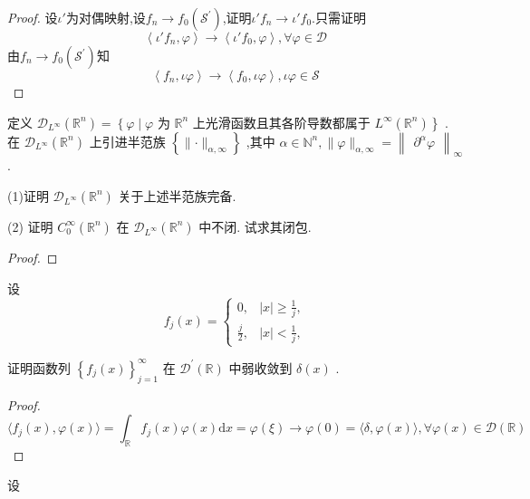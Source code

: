 \documentclass[lang=cn,newtx,10pt,scheme=chinese,thmcnt=chapter]{elegantbook}
\newcommand{\dif}{\mathrm{d}}
\begin{document}
\begin{problemset}
\begin{proof}
    设$\iota'$为对偶映射,设$f_n\to f_0(\mathcal{S}^\prime)$,证明$\iota'f_n\to \iota'f_0$.只需证明\[\left\langle\iota'f_n,\varphi\right\rangle\to \left\langle\iota'f_0,\varphi\right\rangle,\forall \varphi \in \mathcal{D} \]
  由$f_n\to f_0(\mathcal{S}^\prime)$知
\[\left\langle f_n,\iota\varphi\right\rangle\to \left\langle f_0,\iota \varphi\right\rangle,\iota \varphi \in \mathcal{S}\]
\end{proof}
\item 定义 \({\mathcal{D}}_{{L}^{\infty }}\left( {\mathbb{R}}^{n}\right)  = \left\{  {\varphi  \mid  \varphi }\right.\) 为 \({\mathbb{R}}^{n}\) 上光滑函数且其各阶导数都属于 \(\left. {{L}^{\infty }\left( {\mathbb{R}}^{n}\right) }\right\}\) . 在 \({\mathcal{D}}_{{L}^{\infty }}\left( {\mathbb{R}}^{n}\right)\) 上引进半范族 \(\left\{  {\parallel  \cdot  {\parallel }_{\alpha ,\infty }}\right\}\) ,其中 \(\alpha  \in  {\mathbb{N}}^{n},\parallel \varphi {\parallel }_{\alpha ,\infty } = {\begin{Vmatrix}{\partial }^{\alpha }\varphi \end{Vmatrix}}_{\infty }\) .

(1)证明 \({\mathcal{D}}_{{L}^{\infty }}\left( {\mathbb{R}}^{n}\right)\) 关于上述半范族完备.

(2) 证明 \({C}_{0}^{\infty }\left( {\mathbb{R}}^{n}\right)\) 在 \({\mathcal{D}}_{{L}^{\infty }}\left( {\mathbb{R}}^{n}\right)\) 中不闭. 试求其闭包.
\begin{proof}
    
\end{proof}
\item 设
\begin{equation*}
{f}_{j}\left( x\right)  = \left\{  \begin{array}{ll} 0, & \left| x\right|  \geq  \frac{1}{j}, \\  \frac{j}{2}, & \left| x\right|  < \frac{1}{j}, \end{array}\right.
\end{equation*}

证明函数列 \({\left\{  {f}_{j}\left( x\right) \right\}  }_{j = 1}^{\infty }\) 在 \({\mathcal{D}}^{\prime }\left( \mathbb{R}\right)\) 中弱收敛到 \(\delta \left( x\right)\) .

\begin{proof}
    \[
    \langle f_j(x),\varphi(x)\rangle=\int_\mathbb{R}f_j(x)\varphi(x)\dif x=\varphi(\xi)\to \varphi(0)=\langle\delta,\varphi(x)\rangle,\forall \varphi(x)\in \mathcal{D}(\mathbb{R})
    \]
    
\end{proof}
\item 设


\end{problemset}
\end{document}
